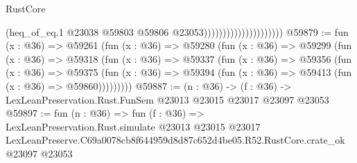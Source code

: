 \begin{lexlean}{RustCore}
\begin{coremodule}
                                            (heq_of_eq.{1}
                                              @23038
                                              @59803
                                              @59806
                                              @23053)))))))))))))))))))))
@59879 := fun (x : @36) =>
  @59261
    (fun (x : @36) =>
    @59280
      (fun (x : @36) =>
      @59299
        (fun (x : @36) =>
        @59318
          (fun (x : @36) =>
          @59337
            (fun (x : @36) =>
            @59356
              (fun (x : @36) =>
              @59375
                (fun (x : @36) => @59394 (fun (x : @36) => @59413 (fun (x : @36) => @59860)))))))))
@59887 := (n : @36) ->
  (f : @36) -> LexLeanPreservation.Rust.FunSem @23013 @23015 @23017 @23097 @23053
@59897 := fun (n : @36) =>
  fun (f : @36) =>
  LexLeanPreservation.Rust.simulate
    @23013
    @23015
    @23017
    LexLeanPreserve.C69a0078cb8f644959d8d87c652d4be05.R52.RustCore.crate_ok
    @23097
    @23053
\end{coremodule}
\end{lexlean}

